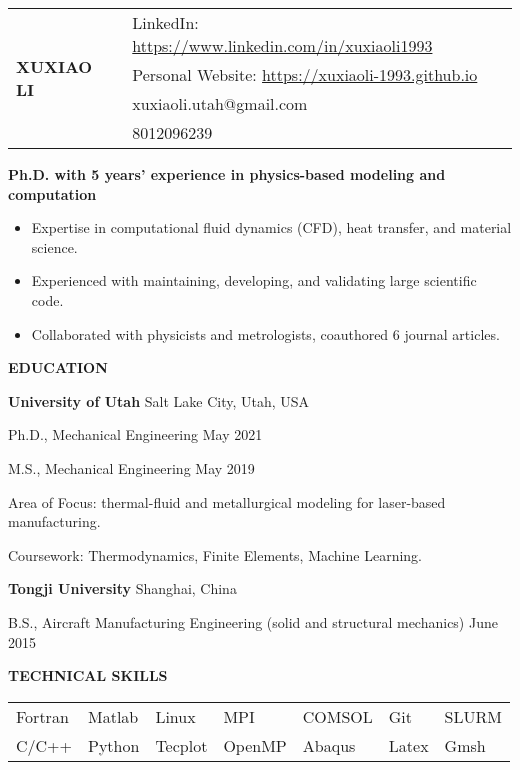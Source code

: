 \documentclass[11pt, letterpaper]{article}
\begin{document}
\begin{tabular}{@{} p{} p{} @{}}
   \multirow{4}{*}{{\textbf{\huge XUXIAO LI}}} & 
    LinkedIn: \href{https://www.linkedin.com/in/xuxiaoli1993}{https://www.linkedin.com/in/xuxiaoli1993} \\
     & Personal Website: \href{https://xuxiaoli-1993.github.io}{https://xuxiaoli-1993.github.io} \\
     & xuxiaoli.utah@gmail.com \\
     & 8012096239
\end{tabular}

\vspace{24pt}

\textbf{Ph.D. with 5 years' experience in physics-based modeling and computation}
\begin{itemize}[leftmargin=*, labelsep=5mm]
   \item Expertise in computational fluid dynamics (CFD), heat transfer, and material science.
   \item Experienced with maintaining, developing, and validating large scientific code.
   \item Collaborated with physicists and metrologists, coauthored 6 journal articles.
\end{itemize}

\vspace{12pt}

\textbf{EDUCATION}

\fullrule

\textbf{University of Utah} \hfill Salt Lake City, Utah, USA

Ph.D., Mechanical Engineering  \hfill May 2021

M.S., Mechanical Engineering  \hfill May 2019

Area of Focus: thermal-fluid and metallurgical modeling for laser-based manufacturing.

Coursework: Thermodynamics, Finite Elements, Machine Learning.

\vskip 6pt

\textbf{Tongji University} 
\hfill
Shanghai, China

B.S., Aircraft Manufacturing Engineering (solid and structural mechanics) \hfill June 2015

\vskip 9pt

\textbf{TECHNICAL SKILLS}

\fullrule

\vskip 3pt

\begin{tabular}{@{} l l l l l l l @{}}
   Fortran & Matlab & Linux & MPI & COMSOL & Git & SLURM \\
   C/C++ & Python & Tecplot & OpenMP & Abaqus & Latex & Gmsh
\end{tabular}
\end{document}
